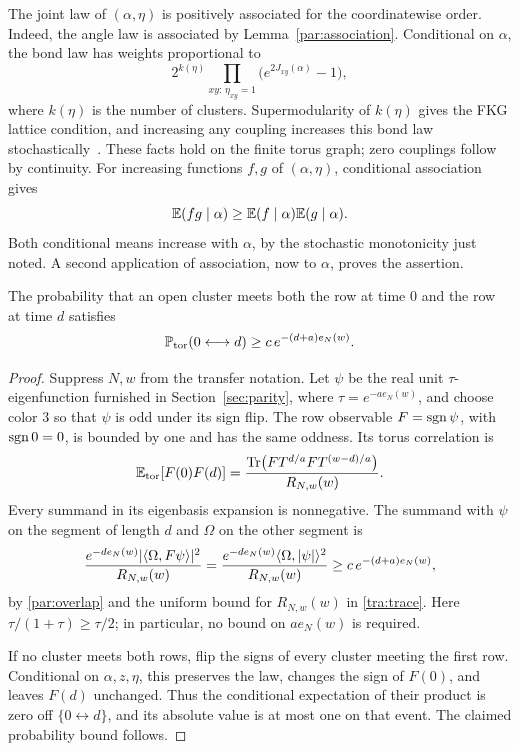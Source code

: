 The joint law of $(\alpha,\eta)$ is positively associated for the
coordinatewise order.  Indeed, the angle law is associated by
Lemma~\ref{par:association}.  Conditional on $\alpha$, the bond law has
weights proportional to
\[
 2^{k(\eta)}\prod_{xy:\,\eta_{xy}=1}
       \bigl(e^{2J_{xy}(\alpha)}-1\bigr),
\]
where $k(\eta)$ is the number of clusters.  Supermodularity of
$k(\eta)$ gives the FKG lattice condition, and increasing any coupling
increases this bond law stochastically~\cite{FKG1971}.  These facts hold
on the finite torus graph; zero couplings follow by continuity.
For increasing functions $f,g$ of $(\alpha,\eta)$, conditional
association gives
\[
 \mathbb E(fg\mid\alpha)\ge \mathbb E(f\mid\alpha)\mathbb E(g\mid\alpha).
\]
Both conditional means increase with $\alpha$, by the stochastic
monotonicity just noted.  A second application of association, now to
$\alpha$, proves the assertion.

\begin{lemma}\label{vis:row-lemma}
The probability that an open cluster meets both the row at time $0$
and the row at time $d$ satisfies
\begin{equation}\label{vis:row-connection}
 \mathbb P_{\mathrm{tor}}(0\longleftrightarrow d)
       \ge c\,e^{-(d+a)e_N(w)}.
\end{equation}
\end{lemma}

\begin{proof}
Suppress $N,w$ from the transfer notation.  Let $\psi$ be the real unit
$\tau$-eigenfunction furnished in Section~\ref{sec:parity}, where
$\tau=e^{-ae_N(w)}$, and choose color $3$ so that $\psi$ is odd under
its sign flip.  The row observable $F=\operatorname{sgn}\psi$, with $\operatorname{sgn}0=0$, is
bounded by one and has the same oddness.  Its torus correlation is
\[
 \mathbb E_{\mathrm{tor}}[F(0)F(d)]
 =\frac{\operatorname{Tr}\bigl(F T^{d/a}F T^{(w-d)/a}\bigr)}{R_{N,w}(w)}.
\]
Every summand in its eigenbasis expansion is nonnegative.  The summand
with $\psi$ on the segment of length $d$ and $\Omega$ on the other
segment is
\[
 \frac{e^{-de_N(w)}|\langle \Omega,F\psi\rangle|^2}{R_{N,w}(w)}
 =\frac{e^{-de_N(w)}\langle \Omega,|\psi|\rangle^2}{R_{N,w}(w)}
 \ge c\,e^{-(d+a)e_N(w)},
\]
by \eqref{par:overlap} and the uniform bound for $R_{N,w}(w)$ in
\eqref{tra:trace}.  Here $\tau/(1+\tau)\ge\tau/2$; in particular,
no bound on $ae_N(w)$ is required.

If no cluster meets both rows, flip the signs of every cluster meeting
the first row.  Conditional on $\alpha,z,\eta$, this preserves the law,
changes the sign of $F(0)$, and leaves $F(d)$ unchanged.  Thus the
conditional expectation of their product is zero off
$\{0\longleftrightarrow d\}$, and its absolute value is at most one
on that event.  The claimed probability bound follows.
\end{proof}

